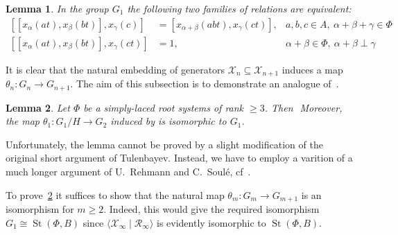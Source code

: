 \documentclass[oneside, 10pt]{amsart}
\DeclareMathOperator{\St}{St}
\newcommand{\XX}[1]{\mathcal{X}_{#1}}
\newcommand{\RR}[1]{\mathcal{R}_{#1}}
\numberwithin{equation}{section}
\newtheorem{lemma}{Lemma}
\numberwithin{lemma}{section}
\theoremstyle{definition}
\theoremstyle{remark}
\newtheorem{rem}[lemma]{Remark}
\begin{document}
 \begin{lemma} In the group $G_1$ the following two families of relations are equivalent:
\begin{align} \nonumber \tag{$d_1$}
[[x_{\alpha}(a t), x_{\beta}(b t)],  x_{\gamma}(c)] & = [x_{\alpha + \beta}(a b t),  x_{\gamma}(c t)], & a,b,c \in A,\ \alpha + \beta + \gamma \in \Phi\\
\nonumber \tag{$e_1$}
[[x_{\alpha}(at), x_{\beta}(bt)], x_{\gamma}(ct) ]& = 1, & \alpha + \beta \in \Phi,\ \alpha+\beta \perp \gamma \end{align}
 \end{lemma}

It is clear that the natural embedding of generators $\mathcal{X}_n \subseteq \mathcal{X}_{n+1}$ induces
 a map $\theta_n\colon G_n \to G_{n+1}$.
The aim of this subsection is to demonstrate an analogue of~\cite[Lemma~3.3]{Tu83}. 
\begin{lemma}\label{lem:tul3.3}
 Let $\Phi$ be a simply-laced root systems of rank $\geq 3$. 
 Then $ $
 Moreover, the map $\theta_1\colon G_1/H \to G_2$ induced by  is isomorphic to $G_1$.
\end{lemma}
Unfortunately, the lemma cannot be proved by a slight modification of the original short argument of Tulenbayev.
Instead, we have to employ a varition of a much longer argument of U.~Rehmann and C.~Soul{\'e}, cf~\cite{Re75,RS76}.

To prove~\cref{lem:tul3.3} it suffices to show that the natural map $\theta_m \colon G_m \to G_{m+1}$ is an isomorphism for $m\geq 2$.
Indeed, this would give the required isomorphism $G_1 \cong \St(\Phi, B)$ since $\langle \XX{\infty} \mid \RR{\infty} \rangle$ is evidently isomorphic to $\St(\Phi, B)$.

\end{document}
